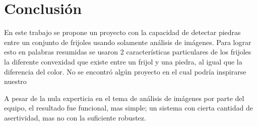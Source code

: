 \documentclass[conference]{IEEEtran}
\begin{document}
\section{Conclusión}
    En este trabajo se propone un proyecto con la capacidad de detectar piedras entre un conjunto de frijoles usando solamente análisis de imágenes. Para lograr esto en palabras resumidas se usaron 2 características particulares de los frijoles la diferente convexidad que existe entre un frijol y una piedra, al igual que la diferencia del color. No se encontró algún proyecto en el cual podría inspirarse nuestro 

    A pesar de la nula experticia en el tema de análisis de imágenes por parte del equipo, el resultado fue funcional, mas simple; un sistema con cierta cantidad de asertividad, mas no con la suficiente robustez.
    

\nocite{*}
\printbibliography
\end{document}

